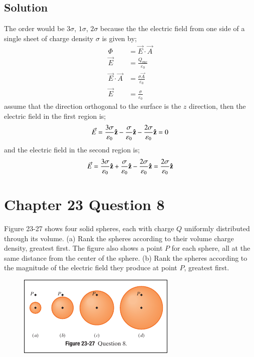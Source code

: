 \documentclass{article}
\begin{document}
\subsection*{Solution}
The order would be $3\sigma$, $1\sigma$, $2\sigma$ because the the electric field from one side of a single sheet of charge density $\sigma$ is given by;
\begin{align*}
    \Phi &= \vec{E} \cdot \vec{A} \\
    \vec{E} &= \frac{Q_\text{enc}}{\varepsilon_0} \\
    \vec{E} \cdot \vec{A} &= \frac{\sigma \vec{A}}{\varepsilon_0} \\
    \vec{E} &= \frac{\sigma}{\varepsilon_0}
\end{align*}
assume that the direction orthogonal to the surface is the $z$ direction, then the electric field in the first region is;
\begin{equation*}
    \vec{E} = \frac{3\sigma}{\varepsilon_0} \vu z - \frac{\sigma}{\varepsilon_0} \vu z - \frac{2\sigma}{\varepsilon_0} \vu z = 0
\end{equation*}
and the electric field in the second region is;
\begin{equation*}
    \vec{E} = \frac{3\sigma}{\varepsilon_0} \vu z + \frac{\sigma}{\varepsilon_0} \vu z - \frac{2\sigma}{\varepsilon_0} \vu z = \frac{2\sigma}{\varepsilon_0} \vu z
\end{equation*}

\section*{Chapter 23 Question 8}
Figure 23-27 shows four solid spheres, each with charge $Q$ uniformly distributed through its volume. (a) Rank the spheres according to their volume charge density, greatest first. The figure also shows a point $P$ for each sphere, all at the same distance from the center of the sphere. (b) Rank the spheres according to the magnitude of the electric field they produce at point $P$, greatest first.

\begin{figure}[ht]
    \centering
    \includegraphics[scale=0.75]{image-2.png}
\end{figure}
\end{document}
